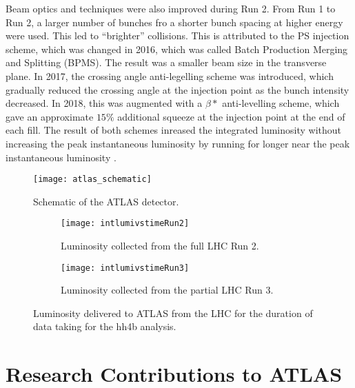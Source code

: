 \documentclass[12pt]{article}
\begin{document}
Beam optics and techniques were also improved during Run 2. From Run 1 to Run 2,
a larger number of bunches fro a shorter bunch spacing at higher energy were
used. This led to ``brighter'' collisions. This is attributed to the PS
injection scheme, which was changed in 2016, which was called Batch Production
Merging and Splitting (BPMS). The result was a smaller beam size in the
transverse plane. In 2017, the crossing angle anti-legelling scheme was
introduced, which gradually reduced the crossing angle at the injection point as
the bunch intensity decreased. In 2018, this was augmented with a $\beta*$
anti-levelling scheme, which gave an approximate $15\%$ additional squeeze at
the injection point at the end of each fill. The result of both schemes inreased
the integrated luminosity without increasing the peak instantaneous luminosity
by running for longer near the peak instantaneous luminosity \cite{Aad_2024}.

\begin{wrapfigure}{r}{0.5\textwidth}
    \centering
    \texttt{[image: atlas\_schematic]}
    \caption{Schematic of the ATLAS detector.}
    \label{fig:atlas_schematic}
\end{wrapfigure}

\newpage
\begin{figure}[t!]
    \centering
    \begin{subfigure}[t]{.48\textwidth}
        \centering
        \texttt{[image: intlumivstimeRun2]}
        \caption{Luminosity collected from the full LHC Run 2.}
        \label{subfig:lumi_run2}
    \end{subfigure}
    \hfill
    \begin{subfigure}[t]{.48\textwidth}
        \centering
        \texttt{[image: intlumivstimeRun3]}
        \caption{Luminosity collected from the partial LHC Run 3.}
        \label{subfig:lumi_run3}
    \end{subfigure}
\caption{Luminosity delivered to ATLAS from the LHC for the duration of data taking for the hh4b analysis.}
\label{figure:lhc_luminosity}
\end{figure}

\section{Research Contributions to ATLAS}
\end{document}
